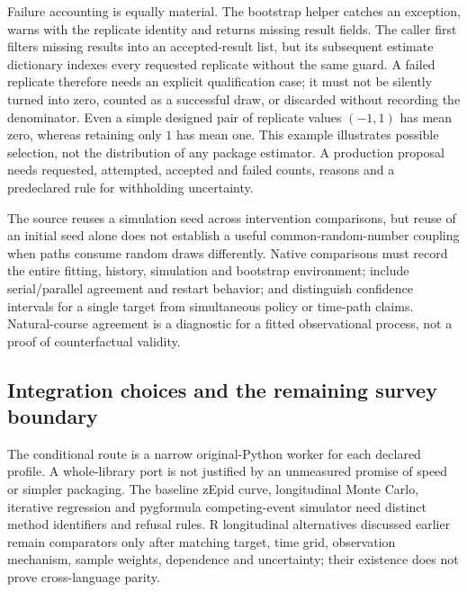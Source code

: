 Failure accounting is equally material. The bootstrap helper catches an
exception, warns with the replicate identity and returns missing result
fields. The caller first filters missing results into an accepted-result list,
but its subsequent estimate dictionary indexes every requested replicate
without the same guard. A failed replicate therefore needs an explicit
qualification case; it must not be silently turned into zero, counted as a
successful draw, or discarded without recording the denominator. Even a
simple designed pair of replicate values $(-1,1)$ has mean zero, whereas
retaining only $1$ has mean one. This example illustrates possible selection,
not the distribution of any package estimator. A production proposal needs
requested, attempted, accepted and failed counts, reasons and a predeclared
rule for withholding uncertainty.~\citep{exec24_longpy_pygformula_source,exec24_longpy_reference}

The source reuses a simulation seed across intervention comparisons, but
reuse of an initial seed alone does not establish a useful common-random-number
coupling when paths consume random draws differently. Native comparisons
must record the entire fitting, history, simulation and bootstrap environment;
include serial/parallel agreement and restart behavior; and distinguish
confidence intervals for a single target from simultaneous policy or time-path
claims. Natural-course agreement is a diagnostic for a fitted observational
process, not a proof of counterfactual validity.
\citep{exec24_longpy_pygformula_source}

\subsection{Integration choices and the remaining survey boundary}
The conditional route is a narrow original-Python worker for each declared
profile. A whole-library port is not justified by an unmeasured promise of
speed or simpler packaging. The baseline zEpid curve, longitudinal Monte Carlo,
iterative regression and pygformula competing-event simulator need distinct
method identifiers and refusal rules. R longitudinal alternatives discussed
earlier remain comparators only after matching target, time grid, observation
mechanism, sample weights, dependence and uncertainty; their existence does
not prove cross-language parity.~\citep{exec24_longpy_zepid_source,exec24_longpy_pygformula_source}

